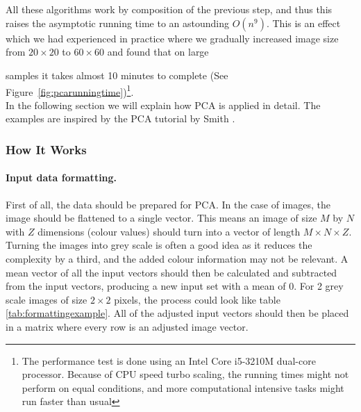 \begin{minipage}{\linewidth}
\centering
{}
\label{fig:pcarunningtime}
\end{minipage}\\\\

All these algorithms work by composition of the previous step, and thus this raises the asymptotic running time to an astounding $\mathit{O}(n^9)$.
This is an effect which we had experienced in practice where we gradually increased image size from $20 \times 20$ to $60 \times 60$ and found that on large

samples it takes almost 10 minutes to complete (See Figure~\ref{fig:pcarunningtime})\footnote{The performance test is done using an Intel Core i5-3210M dual-core processor. Because of CPU speed turbo scaling, the running times might not perform on equal conditions, and more computational intensive tasks might run faster than usual}.\\


In the following section we will explain how PCA is applied in detail. The examples are inspired by the PCA tutorial by Smith \cite{smith2002tutorial}.

\subsubsection{How It Works}
\label{ssub:HowItWorks}
\paragraph{Input data formatting.}
First of all, the data should be prepared for PCA.
In the case of images, the image should be flattened to a single vector.
This means an image of size $M$ by $N$ with $Z$ dimensions (colour values) should turn into a vector of length $M\times N\times Z$.
Turning the images into grey scale is often a good idea as it reduces the complexity by a third, and the added colour information may not be relevant.
A mean vector of all the input vectors should then be calculated and subtracted from the input vectors, producing a new input set with a mean of 0.
For 2 grey scale images of size $2\times 2$ pixels, the process could look like table \ref{tab:formattingexample}.
All of the adjusted input vectors should then be placed in a matrix where every row is an adjusted image vector.

